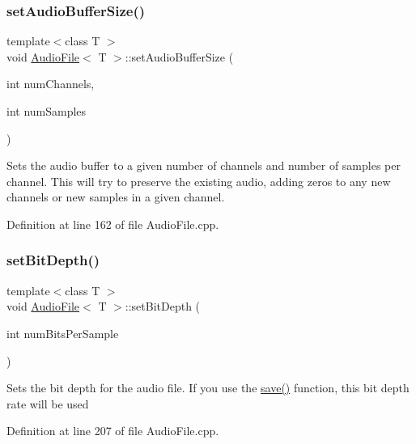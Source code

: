 \mbox{\label{classAudioFile_ac155ed12db0f3b02011a7d75b525e71a}} 
\subsubsection{\texorpdfstring{set\+Audio\+Buffer\+Size()}{setAudioBufferSize()}}
{\footnotesize\ttfamily template$<$class T $>$ \\
void \hyperlink{classAudioFile}{Audio\+File}$<$ T $>$\+::set\+Audio\+Buffer\+Size (\begin{DoxyParamCaption}\item[{int}]{num\+Channels,  }\item[{int}]{num\+Samples }\end{DoxyParamCaption})}

Sets the audio buffer to a given number of channels and number of samples per channel. This will try to preserve the existing audio, adding zeros to any new channels or new samples in a given channel. 

Definition at line 162 of file Audio\+File.\+cpp.

\mbox{\label{classAudioFile_a2adf2ea23e7daeb8401e717c1b3d874b}} 
\subsubsection{\texorpdfstring{set\+Bit\+Depth()}{setBitDepth()}}
{\footnotesize\ttfamily template$<$class T $>$ \\
void \hyperlink{classAudioFile}{Audio\+File}$<$ T $>$\+::set\+Bit\+Depth (\begin{DoxyParamCaption}\item[{int}]{num\+Bits\+Per\+Sample }\end{DoxyParamCaption})}

Sets the bit depth for the audio file. If you use the \hyperlink{classAudioFile_a415239cad5b54b4fef4a210ab79911e3}{save()} function, this bit depth rate will be used 

Definition at line 207 of file Audio\+File.\+cpp.

\mbox{\label{classAudioFile_a354018a94ae15907d7308782f2adadbb}} 
